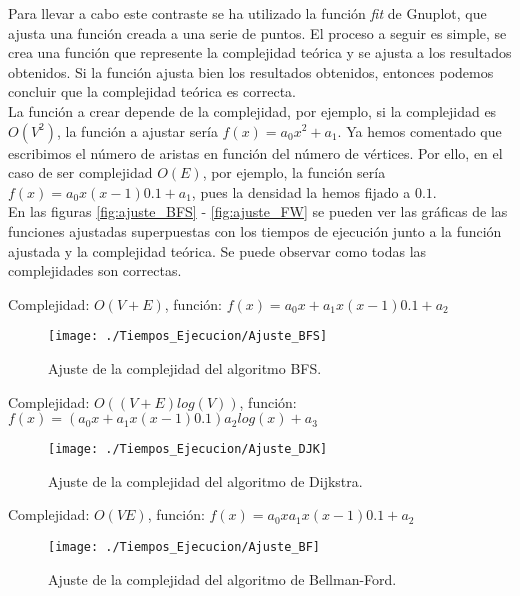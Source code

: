 Para llevar a cabo este contraste se ha utilizado la función \textit{fit} de Gnuplot, que ajusta una función creada a una serie de puntos. El proceso a seguir es simple, se crea una función que represente la complejidad teórica y se ajusta a los resultados obtenidos. Si la función ajusta bien los resultados obtenidos, entonces podemos concluir que la complejidad teórica es correcta. \\

La función a crear depende de la complejidad, por ejemplo, si la complejidad es $O(V^2)$, la función a ajustar sería $f(x) = a_0x^2 + a_1$. Ya hemos comentado que escribimos el número de aristas en función del número de vértices. Por ello, en el caso de ser complejidad $O(E)$, por ejemplo, la función sería $f(x) = a_0x(x-1)0.1 + a_1$, pues la densidad la hemos fijado a $0.1$. \\ 

En las figuras \autoref{fig:ajuste_BFS} - \autoref{fig:ajuste_FW} se pueden ver las gráficas de las funciones ajustadas superpuestas con los tiempos de ejecución junto a la función ajustada y la complejidad teórica. Se puede observar como todas las complejidades son correctas.\\

\newpage

Complejidad: $O(V+E)$, función: $f(x) = a_0x + a_1x(x-1)0.1 + a_2$

\begin{figure}[!htb]
	\centering
	\texttt{[image: ./Tiempos\_Ejecucion/Ajuste\_BFS]}
	
	\caption{Ajuste de la complejidad del algoritmo BFS.}
	\label{fig:ajuste_BFS}
\end{figure}


Complejidad: $O((V+E)log(V))$, función: $f(x) = (a_0x + a_1x(x-1)0.1)a_2log(x) + a_3$

\begin{figure}[!htb]
	\centering
	\texttt{[image: ./Tiempos\_Ejecucion/Ajuste\_DJK]}
	
	\caption{Ajuste de la complejidad del algoritmo de Dijkstra.}
	\label{fig:ajuste_DJK}
\end{figure}


Complejidad: $O(VE)$, función: $f(x) = a_0xa_1x(x-1)0.1 + a_2$

\begin{figure}[!htb]
	\centering
	\texttt{[image: ./Tiempos\_Ejecucion/Ajuste\_BF]}
	
	\caption{Ajuste de la complejidad del algoritmo de Bellman-Ford.}
	\label{fig:ajuste_BF}
\end{figure}

